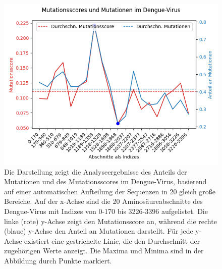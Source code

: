 \documentclass[german,version-2022-01]{uzl-thesis}
\begin{document}
\begin{figure}[tbp]
  \centering
  \includegraphics[scale=0.65]{Images/Diagramm_Scores_und_Mutationen_Dengue_viren_Bereiche.png}
  \caption{Die Darstellung zeigt die Analyseergebnisse des Anteils der Mutationen und des Mutationsscores im Dengue-Virus, basierend auf einer automatischen Aufteilung der Sequenzen in 20 gleich gro\ss{}e Bereiche. Auf der x-Achse sind die 20 Aminos\"aureabschnitte des Dengue-Virus mit Indizes von 0-170 bis 3226-3396 aufgelistet. Die linke (rote) y-Achse zeigt den Mutationsscore an, w\"ahrend die rechte (blaue) y-Achse den Anteil an Mutationen darstellt. F\"ur jede y-Achse existiert eine gestrichelte Linie, die den Durchschnitt der zugeh\"origen Werte anzeigt. Die Maxima und Minima sind in der Abbildung durch Punkte markiert.}
  \label{fig:Dengue_virus_scores_and_mutations_bereiche} 
\end{figure}
\end{document}

